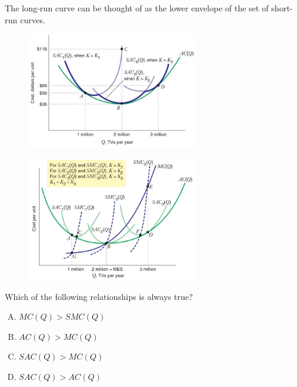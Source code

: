 \documentclass[11pt,t]{beamer}
\begin{document}
\begin{frame}
  The long-run curve can be thought of as the lower envelope of the set of short-run curves.
  \begin{figure}
    \includegraphics[width=280px]{figures/fig8_17.jpg}
  \end{figure}
\end{frame}

\begin{frame}
  \begin{figure}
    \includegraphics[width=280px]{figures/fig8_18.jpg}
  \end{figure}
\end{frame}

\begin{frame}{}

\bigskip
Which of the following relationships is always true?
  \begin{enumerate}[A)]
    \item $MC(Q) > SMC(Q)$
    \item $AC(Q) > MC(Q)$
    \item $SAC(Q) > MC(Q)$
    \item $SAC(Q) > AC(Q)$
  \end{enumerate}
\end{frame}
\end{document}
